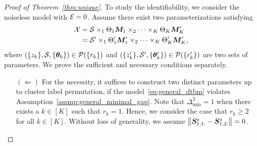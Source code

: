\documentclass[journal]{IEEEtran}
\theoremstyle{definition}
\theoremstyle{definition}
\newcommand{\of}[1]{\left(#1\right)}
\begin{document}
\begin{proof}[Proof of Theorem~\ref{thm:unique}] 

To study the identifiability, we consider the noiseless model with $\mathcal{E} = 0$. Assume there exist two parameterizations satisfying
\begin{align}
    \tX&=\tS\times_1\Theta_1 \mM_1 \times_2 \cdots \times_K \Theta_K \mM'_K\\
    &=\tS'\times_1\Theta'_1 \mM'_1 \times_2 \cdots \times_K \Theta'_K \mM'_K,\label{eq:another}
\end{align}
where $\of{ \{z_k\}, \tS, \{ \mtheta_k \} } \in \tP(\{r_k\})$ and $\of{ \{z'_k\}, \tS', \{ \mtheta'_k \} } \in \tP(\{r_k'\})$ are two sets of parameters. We prove the sufficient and necessary conditions separately.

\begin{enumerate}[wide]
    \item[$(\Leftarrow)$] For the necessity, it suffices to construct two distinct parameters up to cluster label permutation, if the model~\eqref{eq:general_dtbm} violates Assumption~\ref{assmp:general_minimal_gap}. {Note that $\Delta_{\min}^2 = 1$ when there exists a $k \in [K]$ such that $r_k = 1$. Hence, we consider the case that  $r_k \geq 2$ for all $k \in [K]$.}  Without loss of generality, we assume $\left\lVert \bm S_{1,1:}^s - \bm S_{1,2:}^s \right\rVert = 0$.

{
  
}
\end{enumerate}
\end{proof}
\end{document}

